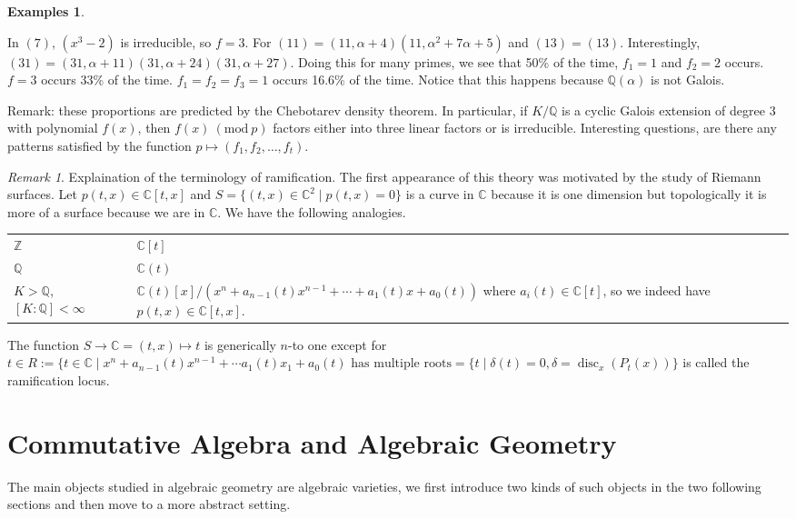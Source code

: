 \documentclass{tufte-handout} %
\theoremstyle{definition}
\newtheorem{exmps}[thm]{Examples}
\theoremstyle{remark}
\newtheorem{rem}[thm]{Remark}
\newcommand{\Mod}[1]{\ (\text{mod}\ #1)}
\newcommand{\Z}{\mathbb{Z}}
\renewcommand{\C}{\mathbb{C}}
\newcommand{\Q}{\mathbb{Q}}
\DeclareMathOperator{\disc}{disc}
\begin{document}
\begin{exmps}
\begin{enumerate}
		In $(7)$, $(x^3-2)$ is irreducible, so $f = 3$. For $(11) = (11,\alpha+4)(11, \alpha^2 + 7\alpha+5)$ and $(13) = (13)$. Interestingly, $(31) = (31,\alpha+11)(31,\alpha+24)(31,\alpha+27)$. Doing this for many primes, we see that 50\% of the time, $f_1 = 1$ and $f_2 = 2$ occurs. $f = 3$ occurs 33\% of the time. $f_1 = f_2 = f_3 = 1$ occurs 16.6\% of the time. Notice that this happens because $\Q(\alpha)$ is not Galois.
		
		Remark: these proportions are predicted by the Chebotarev density theorem. In particular, if $K/\Q$ is a cyclic Galois extension of degree 3 with polynomial $f(x)$, then $f(x) \Mod{p}$ factors either into three linear factors or is irreducible. Interesting questions, are there any patterns satisfied by the function $p \mapsto (f_1, f_2 , \dots, f_t)$.
	\end{enumerate}
\end{exmps}
\begin{rem}
	Explaination of the terminology of ramification. The first appearance of this theory was motivated by the study of Riemann surfaces. Let $p(t,x) \in \C[t,x]$ and $S = \{(t,x) \in \C^2 \mid p(t,x) = 0\}$ is a curve in $\C$ because it is one dimension but topologically it is more of a surface because we are in $\C$. We have the following analogies.
	\begin{table}[]
		\begin{tabular}{ll}
			$\Z$& $\C[t]$ \\
			$\Q$ & $\C(t)$\\
			$K > \Q$, $[K: \Q] < \infty$ & $\C(t)[x]/(x^n+a_{n-1}(t)x^{n-1}+ \cdots + a_1(t)x + a_0(t))$ where $a_i(t) \in \C[t]$, so we indeed have $p(t,x) \in \C[t,x]$.
		\end{tabular}
	\end{table}
	The function $S \rightarrow \C = (t,x) \mapsto t$ is generically $n$-to one except for $t \in R:= \{t \in \C \mid x^n+a_{n-1}(t)x^{n-1} + \cdots a_1(t)x_1 + a_0(t) \text{ has multiple roots} = \{t \mid \delta(t) = 0, \delta = \disc_x(P_t(x))\}$ is called the ramification locus.
\end{rem}
\section{Commutative Algebra and Algebraic Geometry}
The main objects studied in algebraic geometry are algebraic varieties, we first introduce two kinds of such objects in the two following sections and then move to a more abstract setting.
\end{document}
